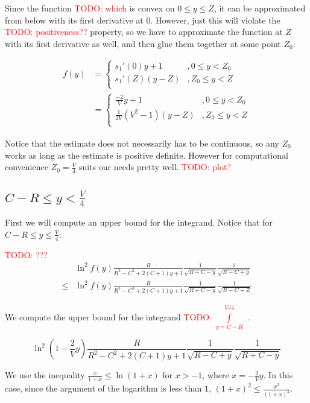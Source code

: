 \documentclass[12pt, a4paper]{article}
\newcommand{\todo}[1]{{\large \textcolor{red}{TODO: #1}}}
\begin{document}
Since the function \todo{which} is convex on $0 \le y \le Z$, it can be approximated from below with its first derivative at $0$. However, just this will violate the \todo{positiveness??} property, so we have to approximate the function at $Z$ with its first derivative as well, and then glue them together at some point $Z_0$:

\begin{align*}
f(y)
& = 
\begin{cases}
s_1'(0) y + 1   &, 0 \le y < Z_0  \\
s_1'(Z) (y - Z) &, Z_0 \le y < Z \\
\end{cases}
\\
& =
\begin{cases}
\frac{-2}{V} y + 1   &, 0 \le y < Z_0  \\
\frac{1}{2 V}(V^2 - 1) (y - Z) &, Z_0 \le y < Z \\
\end{cases}
\end{align*}

Notice that the estimate does not necessarily has to be continuous, so any $Z_0$ works as long as the estimate is positive definite. However for computational convenience $Z_0 = \frac{V}{4}$ suits our needs pretty well. \todo{plot?}


\subsection*{$C - R \le y < \frac{V}{4}$}

First we will compute an upper bound for the integrand. Notice that for $C - R \le y \le \frac{V}{4}$:

\todo{???}
\begin{align*}
    & \ln^2 f(y) \frac{R}{R^2 - C^2 + 2 (C + 1) y + 1} \frac{1}{\sqrt{R + C - y}} \frac{1}{\sqrt{R - C + y}} \\
\le & \ln^2 f(y) \frac{R}{R^2 - C^2 + 2 (C + 1) y + 1} \frac{1}{\sqrt{R + C - y}} \frac{1}{\sqrt{R - C + Z}}
\end{align*}

We compute the upper bound for the integrand \todo{$\int\limits_{y = C - R }^{V/4}$ }.

\[
\ln^2 (1 - \frac{2}{V} y) \frac{R}{R^2 - C^2 + 2 (C + 1) y + 1} \frac{1}{\sqrt{R - C + y}} \frac{1}{\sqrt{R + C - y}}
\]

We use the inequality $\frac{x}{1 + x} \le \ln (1 + x)$ for $x > -1$, where $x = -\frac{2}{V} y$. In this case, since the argument of the logarithm is less than $1$, $(1 + x)^2 \le \frac{x^2}{(1 + x)^2}$.
\end{document}
